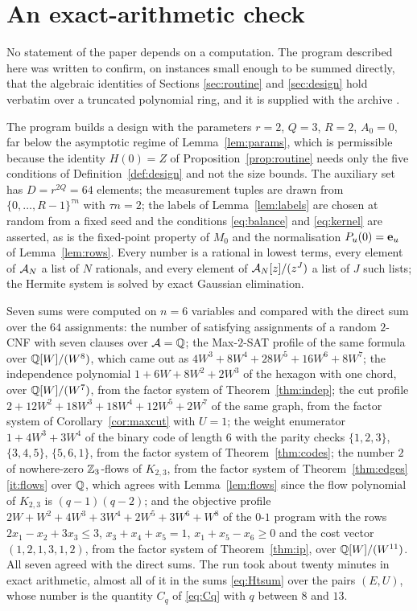 \section{An exact-arithmetic check}\label{app:check}

No statement of the paper depends on a computation. The program described here
was written to confirm, on instances small enough to be summed directly, that
the algebraic identities of Sections \ref{sec:routine} and \ref{sec:design}
hold verbatim over a truncated polynomial ring, and it is supplied with the
archive \cite{Bha26arch}.

The program builds a design with the parameters $r=2$, $Q=3$, $R=2$, $A_0=0$,
far below the asymptotic regime of Lemma~\ref{lem:params}, which is
permissible because the identity $H(0)=Z$ of Proposition~\ref{prop:routine}
needs only the five conditions of Definition~\ref{def:design} and not the size
bounds. The auxiliary set has $D=r^{2Q}=64$ elements; the measurement tuples
are drawn from $\{0,\dots,R-1\}^{\tau n}$ with $\tau n=2$; the labels of
Lemma~\ref{lem:labels} are chosen at random from a fixed seed and the
conditions \eqref{eq:balance} and \eqref{eq:kernel} are asserted, as is the
fixed-point property of $M_0$ and the normalisation $P_u(0)=\mathbf{e}_u$ of
Lemma~\ref{lem:rows}. Every number is a rational in lowest terms, every element
of $\mathcal{A}_N$ a list of $N$ rationals, and every element of $\mathcal{A}_N[z]/(z^{J})$ a list
of $J$ such lists; the Hermite system is solved by exact Gaussian elimination.

Seven sums were computed on $n=6$ variables and compared with the direct sum over
the $64$ assignments: the number of satisfying assignments of a random $2$-CNF
with seven clauses over $\mathcal{A}=\mathbb{Q}$; the Max-$2$-SAT profile of the same formula over
$\mathbb{Q}[W]/(W^{8})$, which came out as
$4W^{3}+8W^{4}+28W^{5}+16W^{6}+8W^{7}$; the independence polynomial
$1+6W+8W^{2}+2W^{3}$ of the hexagon with one chord, over $\mathbb{Q}[W]/(W^{7})$, from
the factor system of Theorem~\ref{thm:indep}; the cut profile
$2+12W^{2}+18W^{3}+18W^{4}+12W^{5}+2W^{7}$ of the same graph, from the factor
system of Corollary~\ref{cor:maxcut} with $U=1$; the weight enumerator
$1+4W^{3}+3W^{4}$ of the binary code of length $6$ with the parity checks
$\{1,2,3\}$, $\{3,4,5\}$, $\{5,6,1\}$, from the factor system of
Theorem~\ref{thm:codes}; the number $2$ of nowhere-zero $\mathbb{Z}_3$-flows of
$K_{2,3}$, from the factor system of Theorem~\ref{thm:edges}\ref{it:flows} over
$\mathbb{Q}$, which agrees with Lemma~\ref{lem:flows} since the flow polynomial of
$K_{2,3}$ is $(q-1)(q-2)$; and the objective profile
$2W+W^{2}+4W^{3}+3W^{4}+2W^{5}+3W^{6}+W^{8}$ of the $0$-$1$ program with the
rows $2x_1-x_2+3x_3\le3$, $x_3+x_4+x_5=1$, $x_1+x_5-x_6\ge0$ and the cost
vector $(1,2,1,3,1,2)$, from the factor system of Theorem~\ref{thm:ip}, over
$\mathbb{Q}[W]/(W^{11})$. All seven agreed with the direct sums. The run took
about twenty minutes in exact arithmetic, almost all of it in the sums
\eqref{eq:Htsum} over the pairs $(E,U)$, whose number is the quantity $C_q$ of
\eqref{eq:Cq} with $q$ between $8$ and $13$.

